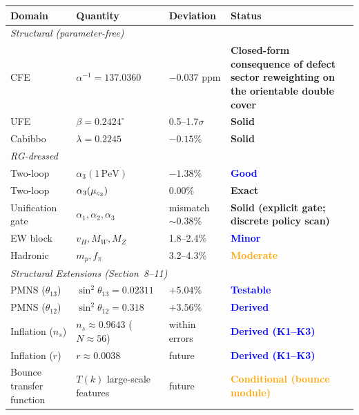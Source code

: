 \begin{table}[H]
\centering
\renewcommand{\arraystretch}{1.3}
\begin{tabular}{@{}p{3cm}p{4cm}p{3cm}l@{}}
\toprule
\textbf{Domain} & \textbf{Quantity} & \textbf{Deviation} & \textbf{Status}\\
\midrule
\multicolumn{4}{l}{\textit{Structural (parameter-free)}}\\
\quad CFE & $\alpha^{-1} = 137.0360$ & $-0.037$ ppm & \textcolor{green!60!black}{\textbf{Closed-form consequence of defect sector reweighting on the orientable double cover}}\\
\quad UFE & $\beta = 0.2424^\circ$ & 0.5--1.7$\sigma$ & \textcolor{green!60!black}{\textbf{Solid}}\\
\quad Cabibbo & $\lambda = 0.2245$ & $-0.15\%$ & \textcolor{green!60!black}{\textbf{Solid}}\\
\midrule
\multicolumn{4}{l}{\textit{RG-dressed}}\\
\quad Two-loop & $\alpha_3(1\,\text{PeV})$ & $-1.38\%$ & \textcolor{blue}{\textbf{Good}}\\
\quad Two-loop & $\alpha_3(\mu_{c_3})$ & $0.00\%$ & \textcolor{green!60!black}{\textbf{Exact}}\\
\quad Unification gate & $\alpha_1,\alpha_2,\alpha_3$ & mismatch $\sim 0.38\%$ & \textcolor{green!60!black}{\textbf{Solid (explicit gate; discrete policy scan)}}\\
\quad EW block & $v_H, M_W, M_Z$ & 1.8--2.4\% & \textcolor{blue}{\textbf{Minor}}\\
\quad Hadronic & $m_p, f_\pi$ & 3.2--4.3\% & \textcolor{orange}{\textbf{Moderate}}\\
\midrule
\multicolumn{4}{l}{\textit{Structural Extensions (Section~8--11)}}\\
\quad PMNS ($\theta_{13}$) & $\sin^2\theta_{13} = 0.02311$ & $+5.04\%$ & \textcolor{blue}{\textbf{Testable}}\\
\quad PMNS ($\theta_{12}$) & $\sin^2\theta_{12} = 0.318$ & $+3.56\%$ & \textcolor{blue}{\textbf{Derived}}\\
\quad Inflation ($n_s$) & $n_s \approx 0.9643$ ($N\approx 56$) & within errors & \textcolor{blue}{\textbf{Derived (K1--K3)}}\\
\quad Inflation ($r$) & $r \approx 0.0038$ & future & \textcolor{blue}{\textbf{Derived (K1--K3)}}\\
\quad Bounce transfer function & $T(k)$ large-scale features & future & \textcolor{orange}{\textbf{Conditional (bounce module)}}\\

\end{tabular}
\end{table}
